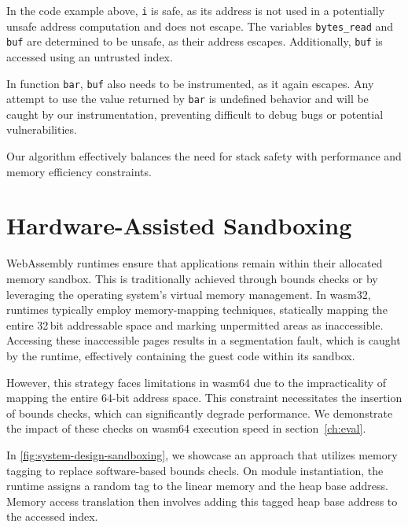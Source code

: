 In the code example above, \texttt{i} is safe, as its address is not used in a potentially unsafe address computation and does not escape.
The variables \texttt{bytes\_read} and \texttt{buf} are determined to be unsafe, as their address escapes.
Additionally, \texttt{buf} is accessed using an untrusted index.

In function \texttt{bar}, \texttt{buf} also needs to be instrumented, as it again escapes.
Any attempt to use the value returned by \texttt{bar} is undefined behavior and will be caught by our instrumentation, preventing difficult to debug bugs or potential vulnerabilities.

\noindent
Our algorithm effectively balances the need for stack safety with performance and memory efficiency constraints.

\section{Hardware-Assisted Sandboxing}
\label{sec:bounds-checks}

WebAssembly runtimes ensure that applications remain within their allocated memory sandbox.
This is traditionally achieved through bounds checks or by leveraging the operating system's virtual memory management.
In wasm32, runtimes typically employ memory-mapping techniques, statically mapping the entire 32\,bit addressable space and marking unpermitted areas as inaccessible.
Accessing these inaccessible pages results in a segmentation fault, which is caught by the runtime, effectively containing the guest code within its sandbox.

However, this strategy faces limitations in wasm64 due to the impracticality of mapping the entire 64-bit address space.
This constraint necessitates the insertion of bounds checks, which can significantly degrade performance.
We demonstrate the impact of these checks on wasm64 execution speed in section~\ref{ch:eval}.

In \cref{fig:system-design-sandboxing}, we showcase an approach that utilizes memory tagging to replace software-based bounds checls.
On module instantiation, the runtime assigns a random tag to the linear memory and the heap base address.
Memory access translation then involves adding this tagged heap base address to the accessed index.

